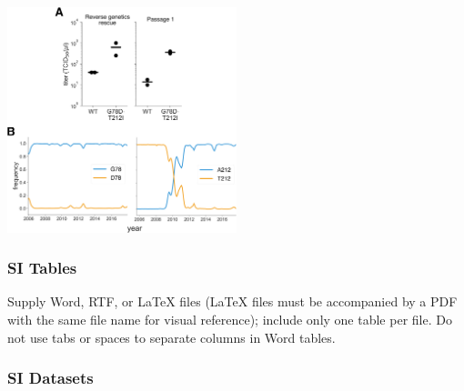 \documentclass[9pt,twocolumn,twoside]{pnas-new}
\begin{document}
\begin{suppfigure}
\centerline{\includegraphics[width=0.5\textwidth]{figs/S01_G78D-T212I/G78D-T212I.pdf}}
\caption{\label{suppfig:Perth2009_mut}
{\bf Characterization of the G78D-T212I Perth/2009 HA variant.} 
(A) 
The G78D-T212I Perth/2009 HA variant supports better viral growth than the wildtype Perth/2009 HA.
Viruses were generated in duplicate by reverse genetics with the Perth/2009 NA and WSN internal genes, and passaged once at MOI = 0.01 in MDCK-SIAT1-TMPRSS2 cells.
The rescue and passage viral supernatants were collected at 72 hours post-transfection and 44 hours post-infection, respectively, and titered in MDCK-SIAT1-TMPRSS2 cells. 
The points mark each duplicate and the bar marks the mean.
(B)
The D78 variant remained at a low frequency in natural human H3N2 sequences over the past $~\sim$10 years.
The A212 variant rose to fixation in $~\sim$2011, replacing the T212 variant.
}
\end{suppfigure}

\subsubsection*{SI Tables}

Supply Word, RTF, or LaTeX files (LaTeX files must be accompanied by a PDF with the same file name for visual reference); include only one table per file. Do not use tabs or spaces to separate columns in Word tables.

\subsubsection*{SI Datasets} 

\begin{suppdata}
\caption{\label{suppdata:PerthHA}
Genbank file giving the full sequence of the bidirectional reverse-genetics plasmid pHW-Perth2009-HA-G78D-T212I, which encodes the wildtype HA sequence used in this study.
}
\end{suppdata}
\end{document}
